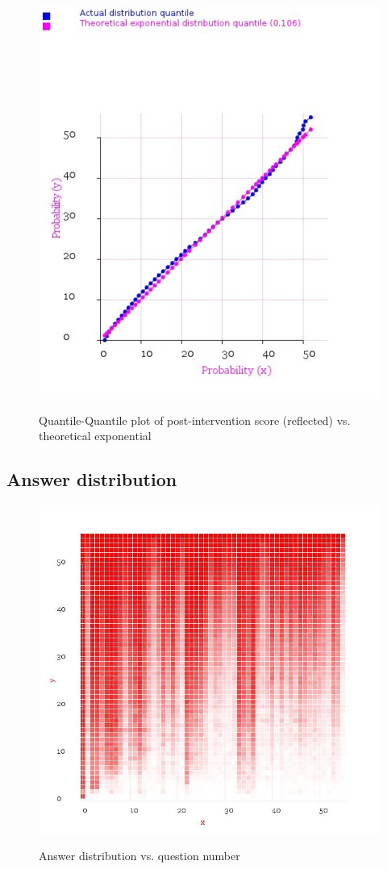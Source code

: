 \documentclass[10pt]{article}
\begin{document}
\newpage
\begin{figure}
\caption{Quantile-Quantile plot of post-intervention score (reflected) vs. theoretical exponential}
\label{QQPlotPostVsExponential}
\begin{center}
\includegraphics[width=120mm]{ReportMedia/QQPlotPostVsExponential.jpg}\\
\end{center}
\end{figure}
\newpage
\subsection{Answer distribution}
\begin{figure}
\caption{Answer distribution vs. question number}
\label{AnswerDistribution}
\begin{center}
\includegraphics[width=120mm]{ReportMedia/AnswerDistribution.jpg}\\
\end{center}
\end{figure}
\end{document}
